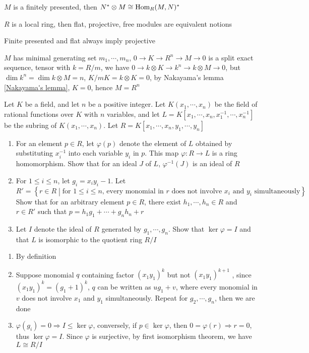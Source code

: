 \documentclass[main]{subfiles}
\begin{document}
\begin{exercise}
$M$ is a finitely presented, then $N^*\otimes M\cong \operatorname{Hom}_R(M,N)^*$ \par
$R$ is a local ring, then flat, projective, free modules are equivalent notions
\end{exercise}

\begin{solution}
Finite presented and flat always imply projective \par
$M$ has minimal generating set $m_1,\cdots,m_n$, $0\to K\to R^n\to M\to0$ is a split exact sequence, tensor with $k=R/m$, we have $0\to k\otimes K\to k^n\to k\otimes M\to0$, but $\dim k^n=\dim k\otimes M=n$, $K/mK=k\otimes K=0$, by Nakayama's lemma \ref{Nakayama's lemma}, $K=0$, hence $M=R^n$
\end{solution}

\begin{exercise}
Let $K$ be a field, and let $n$ be a positive integer. Let $K(x_1,\cdots,x_n)$ be the field of rational functions over $K$ with $n$ variables, and let $L=K[x_1,\cdots,x_n,x_1^{-1},\cdots,x_n^{-1}]$ be the subring of $K(x_1,\cdots,x_n)$. Let $R=K[x_1,\cdots,x_n,y_1,\cdots,y_n]$
\begin{enumerate}[leftmargin=*,label=\textbf{\arabic*.}]
\item For an element $p\in R$, let $\varphi(p)$ denote the element of $L$ obtained by substituting $x_i^{-1}$ into each variable $y_i$ in $p$. This map $\varphi:R\to L$ is a ring homomorphism. Show that for an ideal $J$ of $L$, $\varphi^{-1}(J)$ is an ideal of $R$
\item For $1\leq i\leq n$, let $g_i=x_iy_i-1$. Let
\[R'=\left\{r\in R\middle|\text{for }1\leq i\leq n\text{, every monomial in }r\text{ does not involve }x_i\text{ and }y_i\text{ simultaneously}\right\}\]
Show that for an arbitrary element $p\in R$, there exist $h_1,\cdots,h_n\in R$ and $r\in R'$ such that $p=h_1g_1+\cdots+g_nh_n+r$
\item Let $I$ denote the ideal of $R$ generated by $g_1,\cdots,g_n$. Show that $\ker\varphi=I$ and that $L$ is isomorphic to the quotient ring $R/I$
\end{enumerate}
\end{exercise}

\begin{solution}
\begin{enumerate}[leftmargin=*,label=\textbf{\arabic*.}]
\item By definition
\item Suppose monomial $q$ containing factor $(x_1y_1)^k$ but not $(x_1y_1)^{k+1}$ , since $(x_1y_1)^k=(g_1+1)^k$, $q$ can be written as $ug_1+v$, where every monomial in $v$ does not involve $x_1$ and $y_1$ simultaneously. Repeat for $g_2,\cdots,g_n$, then we are done
\item $\varphi(g_i)=0\Rightarrow I\leq\ker\varphi$, conversely, if $p\in\ker\varphi$, then $0=\varphi(r)\Rightarrow r=0$, thus $\ker\varphi=I$. Since $\varphi$ is surjective, by first isomorphism theorem, we have $L\cong R/I$
\end{enumerate}
\end{solution}
\end{document}
